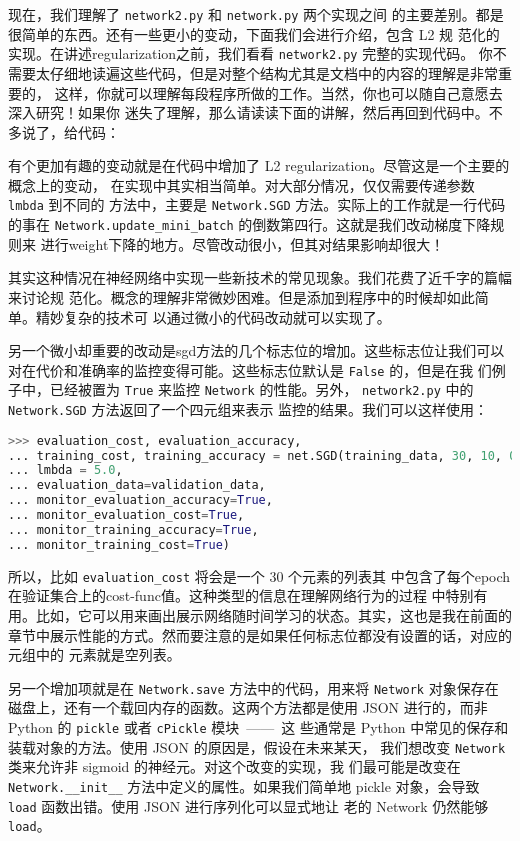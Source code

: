 现在，我们理解了 \lstinline!network2.py! 和 \lstinline!network.py! 两个实现之间
的主要差别。都是很简单的东西。还有一些更小的变动，下面我们会进行介绍，包含 L2 规
范化的实现。在讲述\gls*{regularization}之前，我们看看 \lstinline!network2.py! 完整的实现代码。
你不需要太仔细地读遍这些代码，但是对整个结构尤其是文档中的内容的理解是非常重要的，
这样，你就可以理解每段程序所做的工作。当然，你也可以随自己意愿去深入研究！如果你
迷失了理解，那么请读读下面的讲解，然后再回到代码中。不多说了，给代码：



有个更加有趣的变动就是在代码中增加了 L2 \gls*{regularization}。尽管这是一个主要的概念上的变动，
在实现中其实相当简单。对大部分情况，仅仅需要传递参数 \lstinline!lmbda! 到不同的
方法中，主要是 \lstinline!Network.SGD! 方法。实际上的工作就是一行代码的事在
\lstinline!Network.update_mini_batch! 的倒数第四行。这就是我们改动梯度下降规则来
进行\gls*{weight}下降的地方。尽管改动很小，但其对结果影响却很大！

其实这种情况在神经网络中实现一些新技术的常见现象。我们花费了近千字的篇幅来讨论规
范化。概念的理解非常微妙困难。但是添加到程序中的时候却如此简单。精妙复杂的技术可
以通过微小的代码改动就可以实现了。

另一个微小却重要的改动是\gls*{sgd}方法的几个标志位的增加。这些标志位让我们可以
对在代价和准确率的监控变得可能。这些标志位默认是 \lstinline!False! 的，但是在我
们例子中，已经被置为 \lstinline!True! 来监控 \lstinline!Network! 的性能。另外，
\lstinline!network2.py! 中的 \lstinline!Network.SGD! 方法返回了一个四元组来表示
监控的结果。我们可以这样使用：
\begin{lstlisting}[language=Python]
>>> evaluation_cost, evaluation_accuracy, 
... training_cost, training_accuracy = net.SGD(training_data, 30, 10, 0.5,
... lmbda = 5.0,
... evaluation_data=validation_data,
... monitor_evaluation_accuracy=True,
... monitor_evaluation_cost=True,
... monitor_training_accuracy=True,
... monitor_training_cost=True)
\end{lstlisting}

所以，比如 \lstinline!evaluation_cost! 将会是一个 $30$ 个元素的列表其
中包含了每个\gls*{epoch}在验证集合上的\gls*{cost-func}值。这种类型的信息在理解网络行为的过程
中特别有用。比如，它可以用来画出展示网络随时间学习的状态。其实，这也是我在前面的
章节中展示性能的方式。然而要注意的是如果任何标志位都没有设置的话，对应的元组中的
元素就是空列表。

另一个增加项就是在 \lstinline!Network.save! 方法中的代码，用来将
\lstinline!Network! 对象保存在磁盘上，还有一个载回内存的函数。这两个方法都是使用
JSON 进行的，而非 Python 的 \lstinline!pickle! 或者 \lstinline!cPickle! 模块~——~这
些通常是 Python 中常见的保存和装载对象的方法。使用 JSON 的原因是，假设在未来某天，
我们想改变 \lstinline!Network! 类来允许非 sigmoid 的神经元。对这个改变的实现，我
们最可能是改变在 \lstinline!Network.__init__! 方法中定义的属性。如果我们简单地
pickle 对象，会导致 \lstinline!load! 函数出错。使用 JSON 进行序列化可以显式地让
老的 Network 仍然能够 \lstinline!load!。

